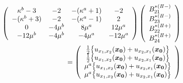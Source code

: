 \begin{align}
	\left(
	\begin{array}{cccc}
		\kappa^b-3& -2 & -(\kappa^a+1) & -2 \\
		-(\kappa^b+3) & -2 & -(\kappa^a-1) & 2 \\
		0 & -4\mu^{b} & 8\mu^{a} & 12\mu^{a} \\
		-12\mu^{b} & -4\mu^{b} & -4\mu^{a} & -12\mu^{a} \\
	\end{array}
	\right)
	\left(
	\begin{array}{c}
		B_{21}^{*(I\hspace{-.15em}I-)} \\
	 	B_{23}^{*(I\hspace{-.15em}I-)} \\
		B_{22}^{*(I\hspace{-.15em}I+)}\\
	 	B_{24}^{*(I\hspace{-.15em}I+)} \\
	\end{array}
	\right)
	\nonumber
	\\
	=
	\left(
	\begin{array}{c}
		\frac{1}{2}\bigl\{u_{x_{1},x_{2}}(\bm{x_{0}})+u_{x_{2},x_{1}}(\bm{x_{0}})\bigr\} \\
	 	\frac{1}{2}\bigl\{u_{x_{1},x_{2}}(\bm{x_{0}})+u_{x_{2},x_{1}}(\bm{x_{0}})\bigr\} \\
		\mu^a\bigl\{u_{x_{1},x_{2}}(\bm{x_{0}})+u_{x_{2},x_{1}}(\bm{x_{0}})\bigr\} \\
	 	\mu^a \bigl\{u_{x_{1},x_{2}}(\bm{x_{0}})+u_{x_{2},x_{1}}(\bm{x_{0}})\bigr\} \\
	\end{array}
	\right)
\end{align}

